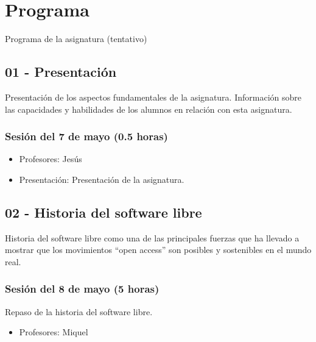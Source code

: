 \documentclass[a4paper,12pt]{article}
\begin{document}
\section{Programa}

Programa de la asignatura (tentativo)

\subsection{01 - Presentación}

Presentación de los aspectos fundamentales de la asignatura. Información sobre las capacidades y habilidades de los alumnos en relación con esta asignatura.

\subsubsection{Sesión del 7 de mayo (0.5 horas)}

\begin{itemize}
\item Profesores: Jesús
\item Presentación: Presentación de la asignatura.
\end{itemize}

\subsection{02 - Historia del software libre}

Historia del software libre como una de las principales fuerzas que ha llevado a mostrar que los movimientos ``open access'' son posibles y sostenibles en el mundo real.

\subsubsection{Sesión del 8 de mayo (5 horas)}

Repaso de la historia del software libre.

\begin{itemize}
\item Profesores: Miquel
\end{itemize}
\end{document}
